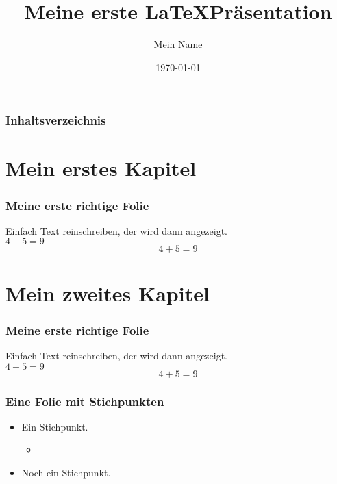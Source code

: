 \documentclass{beamer}
\title{Meine erste \LaTeX Präsentation}
\author{Mein Name}
\date{\today}
\begin{document}
	
\frame{\titlepage}

\begin{frame}
	\frametitle{Inhaltsverzeichnis}
	\tableofcontents
\end{frame}

\section{Mein erstes Kapitel}
\begin{frame}
	\frametitle{Meine erste richtige Folie}
	Einfach Text reinschreiben, der wird dann angezeigt. \\
	$4 + 5 = 9$
	\begin{equation}
		4 + 5 = 9
	\end{equation}
\end{frame}
\section{Mein zweites Kapitel}
\begin{frame}
	\frametitle{Meine erste richtige Folie}
	Einfach Text reinschreiben, der wird dann angezeigt. \\
	$4 + 5 = 9$
	\begin{equation}
		4 + 5 = 9
	\end{equation}
\end{frame}

\begin{frame}
	\frametitle{Eine Folie mit Stichpunkten}
	\begin{itemize}
		\item Ein Stichpunkt.
		\begin{itemize}
			\item 
		\end{itemize}
		\item Noch ein Stichpunkt.
	\end{itemize}
\end{frame}
\end{document}
